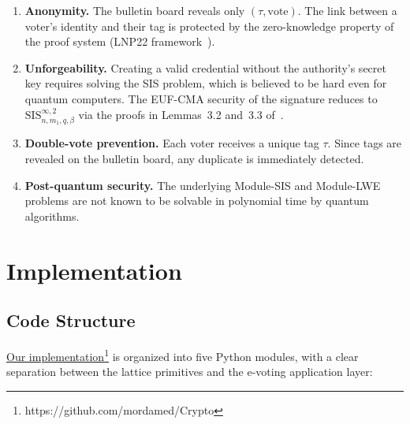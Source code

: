 \documentclass[a4paper]{article}
\begin{document}
\begin{enumerate}[leftmargin=2.5em]
    \item \textbf{Anonymity.} The bulletin board reveals only $(\tau, \text{vote})$. The link between a voter's identity and their tag is protected by the zero-knowledge property of the proof system (LNP22 framework~\cite{LNP22}).
    \item \textbf{Unforgeability.} Creating a valid credential without the authority's secret key requires solving the SIS problem, which is believed to be hard even for quantum computers. The EUF-CMA security of the signature reduces to $\text{SIS}_{n, m_1, q, \beta}^{\infty,2}$ via the proofs in Lemmas~3.2 and~3.3 of~\cite{mainPaper}.
    \item \textbf{Double-vote prevention.} Each voter receives a unique tag $\tau$. Since tags are revealed on the bulletin board, any duplicate is immediately detected.
    \item \textbf{Post-quantum security.} The underlying Module-SIS and Module-LWE problems are not known to be solvable in polynomial time by quantum algorithms.
\end{enumerate}


\section{Implementation}

\subsection{Code Structure}

\href{https://github.com/mordamed/Crypto}{Our implementation}\footnote[1]{https://github.com/mordamed/Crypto} is organized into five Python modules, with a clear separation between the lattice primitives and the e-voting application layer:
\end{document}
